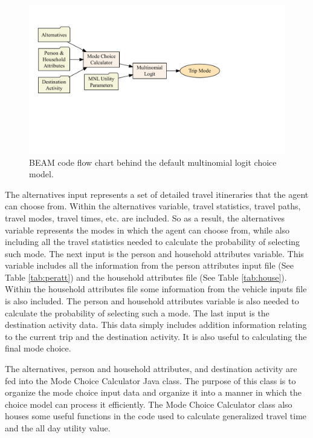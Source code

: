 \documentclass[12pt, oneside, openright]{byuthesis}
\begin{document}
\begin{figure}

{\centering \includegraphics[width=600px]{thesis_files/figure-latex/mnlflow-1} 

}

\caption{BEAM code flow chart behind the default multinomial logit choice model.}\label{fig:mnlflow}
\end{figure}

The alternatives input represents a set of detailed travel itineraries that the agent can choose from. Within the alternatives variable, travel statistics, travel paths, travel modes, travel times, etc. are included. So as a result, the alternatives variable represents the modes in which the agent can choose from, while also including all the travel statistics needed to calculate the probability of selecting such mode. The next input is the person and household attributes variable. This variable includes all the information from the person attributes input file (See Table \ref{tab:peratt}) and the household attributes file (See Table \ref{tab:house}). Within the household attributes file some information from the vehicle inputs file is also included. The person and household attributes variable is also needed to calculate the probability of selecting such a mode. The last input is the destination activity data. This data simply includes addition information relating to the current trip and the destination activity. It is also useful to calculating the final mode choice.

The alternatives, person and household attributes, and destination activity are fed into the Mode Choice Calculator Java class. The purpose of this class is to organize the mode choice input data and organize it into a manner in which the choice model can process it efficiently. The Mode Choice Calculator class also houses some useful functions in the code used to calculate generalized travel time and the all day utility value.
\end{document}
